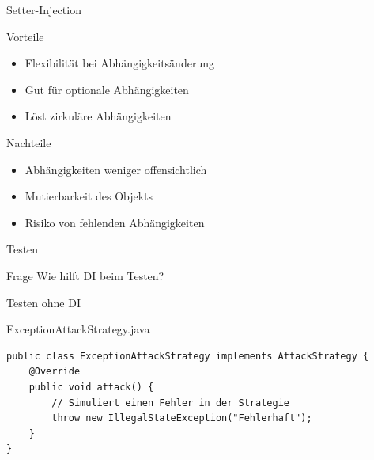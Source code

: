 \begin{frame}{Setter-Injection} 
    \begin{exampleblock}{Vorteile} 
        \begin{itemize} 
            \item Flexibilität bei Abhängigkeitsänderung 
            \item Gut für optionale Abhängigkeiten 
            \item Löst zirkuläre Abhängigkeiten 
        \end{itemize} 
    \end{exampleblock}
    \begin{alertblock}{Nachteile}
        \begin{itemize} 
            \item Abhängigkeiten weniger offensichtlich 
            \item Mutierbarkeit des Objekts 
            \item Risiko von fehlenden Abhängigkeiten 
        \end{itemize} 
    \end{alertblock}       
\end{frame}


\begin{frame}{Testen}
	\begin{block}{Frage}
		Wie hilft DI beim Testen?
	\end{block}
\end{frame}

\begin{frame}[fragile]{Testen ohne DI}
	\begin{exampleblock}{ExceptionAttackStrategy.java}
		\begin{lstlisting}
public class ExceptionAttackStrategy implements AttackStrategy {
	@Override
	public void attack() {
		// Simuliert einen Fehler in der Strategie
		throw new IllegalStateException("Fehlerhaft");
	}
}
		\end{lstlisting}
	\end{exampleblock}
\end{frame}

